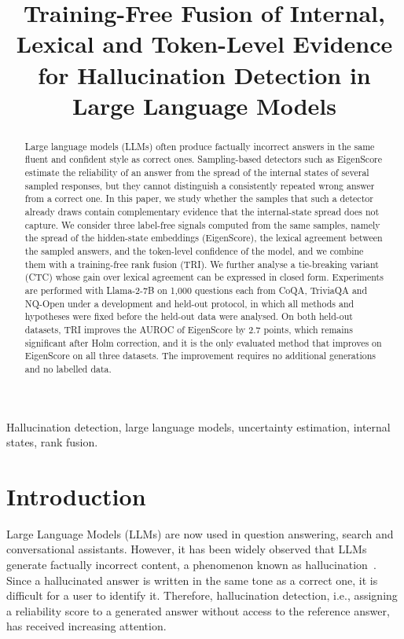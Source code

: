 \documentclass[conference]{IEEEtran}
\begin{document}
\title{Training-Free Fusion of Internal, Lexical and Token-Level Evidence for Hallucination Detection in Large Language Models}

\author{
}

\maketitle

\begin{abstract}
Large language models (LLMs) often produce factually incorrect answers in the same fluent and confident style as correct ones. Sampling-based detectors such as EigenScore estimate the reliability of an answer from the spread of the internal states of several sampled responses, but they cannot distinguish a consistently repeated wrong answer from a correct one. In this paper, we study whether the samples that such a detector already draws contain complementary evidence that the internal-state spread does not capture. We consider three label-free signals computed from the same samples, namely the spread of the hidden-state embeddings (EigenScore), the lexical agreement between the sampled answers, and the token-level confidence of the model, and we combine them with a training-free rank fusion (TRI). We further analyse a tie-breaking variant (CTC) whose gain over lexical agreement can be expressed in closed form. Experiments are performed with Llama-2-7B on 1,000 questions each from CoQA, TriviaQA and NQ-Open under a development and held-out protocol, in which all methods and hypotheses were fixed before the held-out data were analysed. On both held-out datasets, TRI improves the AUROC of EigenScore by 2.7 points, which remains significant after Holm correction, and it is the only evaluated method that improves on EigenScore on all three datasets. The improvement requires no additional generations and no labelled data.
\end{abstract}

\begin{IEEEkeywords}
Hallucination detection, large language models, uncertainty estimation, internal states, rank fusion.
\end{IEEEkeywords}

\section{Introduction}
Large Language Models (LLMs) are now used in question answering, search and conversational assistants. However, it has been widely observed that LLMs generate factually incorrect content, a phenomenon known as hallucination~\cite{farquhar2024}. Since a hallucinated answer is written in the same tone as a correct one, it is difficult for a user to identify it. Therefore, hallucination detection, i.e., assigning a reliability score to a generated answer without access to the reference answer, has received increasing attention.
\end{document}
